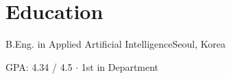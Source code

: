 \section{Education}
      {B.Eng. in Applied Artificial Intelligence}{Seoul, Korea}

GPA: 4.34 / 4.5 \;$\cdot$\; 1st in Department
